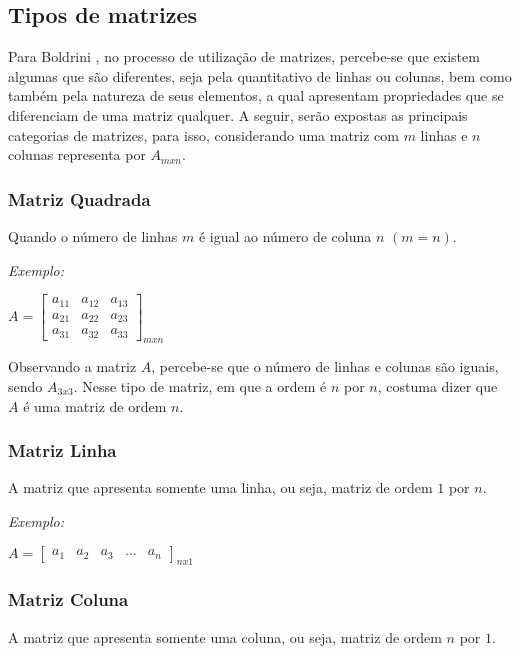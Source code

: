 %
\subsection{Tipos de matrizes}
\noindent Para Boldrini \cite{1980:Boldrini}, no processo de utilização de matrizes, percebe-se que existem algumas que são diferentes, seja pela quantitativo de linhas ou colunas, bem como também pela natureza de seus elementos, a qual apresentam propriedades que se diferenciam de uma matriz qualquer. A seguir, serão expostas as principais categorias de matrizes, para isso, considerando uma matriz com $m$ linhas e $n$ colunas representa por $A{}_{mxn}$.

\subsubsection{Matriz Quadrada}
\noindent Quando o número de linhas $m$ é igual ao número de coluna $n$ $(m = n)$.

\textit{Exemplo:}
\begin{center}
    $A = 
    \begin{bmatrix}
        a_{11} & a_{12} & a_{13} \\ 
        a_{21} & a_{22} & a_{23} \\ 
        a_{31} & a_{32} & a_{33} 
    \end{bmatrix}_{mxn}$
\end{center}

Observando a matriz $A$, percebe-se que o número de linhas e colunas são iguais, sendo $A{}_{3x3}$. Nesse tipo de matriz, em que a ordem é $n$ por $n$, costuma dizer que $A$ é uma matriz de ordem $n$.

\subsubsection{Matriz Linha}
\noindent A matriz que apresenta somente uma linha, ou seja, matriz de ordem $1$ por $n$.

\textit{Exemplo:}
\begin{center}
    $A = 
    \begin{bmatrix}
        a_{1} & a_{2} & a_{3} & \ldots & a_{n}
    \end{bmatrix}_{n x 1}$
\end{center}

\subsubsection{Matriz Coluna}
\noindent A matriz que apresenta somente uma coluna, ou seja, matriz de ordem $n$ por $1$.


